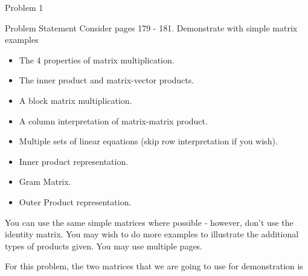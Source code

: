 \begin{problem}{Problem 1}
    \begin{statement}{Problem Statement}
        Consider pages 179 - 181.  Demonstrate with simple matrix examples

        \begin{itemize}
            \item The 4 properties of matrix multiplication.
            \item The inner product and matrix-vector products.
            \item A block matrix multiplication.
            \item A column interpretation of matrix-matrix product.
            \item Multiple sets of linear equations (skip row interpretation if you wish).
            \item Inner product representation.
            \item Gram Matrix.
            \item Outer Product representation.
        \end{itemize}

        You can use the same simple matrices where possible - however, don't use the identity matrix. You may wish to do more examples to illustrate the additional types of products given. You may use 
        multiple pages.
    \end{statement}

    \begin{highlight}[Solution]
        For this problem, the two matrices that we are going to use for demonstration is


\end{highlight}
\end{problem}
